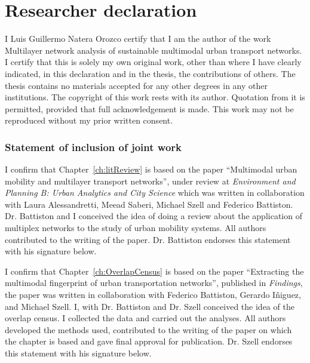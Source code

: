 \documentclass[a4paper,twoside,12pt]{book}
\begin{document}
\mbox{}

\pagestyle{empty}

\newpage

\chapter*{Researcher declaration}
I Luis Guillermo Natera Orozco certify that I am the author of the work Multilayer network analysis of sustainable multimodal urban transport networks. I certify that this is solely my own original work, other than where I have clearly indicated, in this declaration and in the thesis, the contributions of others. The thesis contains no materials accepted for any other degrees in any other institutions.  The copyright of this work rests with its author. Quotation from it is permitted, provided that full acknowledgement is made. This work may not be reproduced without my prior written consent.

\subsection*{Statement of inclusion of joint work}
I confirm that Chapter~\ref{ch:litReview} is based on the paper ``Multimodal urban mobility and multilayer transport networks'', under review at \textit{Environment and Planning B: Urban Analytics and City Science} which was written in collaboration with Laura Alessandretti, Meead Saberi, Michael Szell and Federico Battiston. Dr. Battiston and I conceived the idea of doing a review about the application of multiplex networks to the study of urban mobility systems. All authors contributed to the writing of the paper. Dr. Battiston endorses this statement with his signature below.

\vspace{.2cm}

I confirm that Chapter~\ref{ch:OverlapCensus} is based on the paper ``Extracting the multimodal fingerprint of urban transportation networks'', published in \textit{Findings}, the paper was written in collaboration with Federico Battiston, Gerardo I\~niguez, and Michael Szell. I, with Dr. Battiston and Dr. Szell conceived the idea of the overlap census. I collected the data and carried out the analyses. All authors developed the methods used, contributed to the writing of the paper on which the chapter is based and gave final approval for publication. Dr. Szell endorses this statement with his signature below.

\vspace{.2cm}
\end{document}
